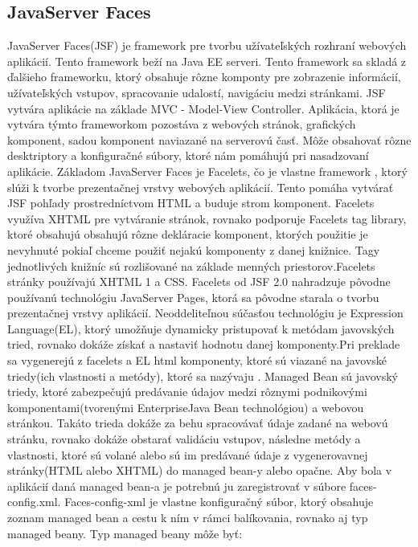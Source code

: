 \subsection{JavaServer Faces}
JavaServer Faces(JSF)  je framework pre tvorbu užívateľských rozhraní webových aplikácií. Tento framework beží na Java EE serveri. Tento framework sa skladá z ďalšieho frameworku, ktorý obsahuje rôzne komponty pre zobrazenie informácií, užívateľských vstupov, spracovanie udalostí, navigáciu medzi stránkami. JSF vytvára aplikácie na základe MVC - Model-View Controller. Aplikácia, ktorá je vytvára týmto frameworkom pozostáva z webových stránok, grafických komponent, sadou komponent naviazané na serverovú časť. Môže obsahovať rôzne desktriptory a konfiguračné súbory, ktoré nám pomáhujú pri nasadzovaní aplikácie. Základom JavaServer Faces je Facelets, čo je vlastne framework , ktorý slúži k tvorbe prezentačnej vrstvy webových aplikácií. Tento pomáha vytvárať JSF pohľady prostredníctvom HTML a buduje strom komponent. Facelets využíva XHTML pre vytváranie stránok, rovnako podporuje Facelets tag library, ktoré obsahujú obsahujú rôzne dekláracie komponent, ktorých použitie je nevyhnuté pokiaľ chceme použiť nejakú komponenty z danej knižnice. Tagy jednotlivých knižníc sú rozlišované na základe menných priestorov.Facelets stránky používajú XHTML 1 a CSS. Facelets od JSF 2.0 nahradzuje pôvodne používanú technológiu JavaServer Pages, ktorá sa pôvodne starala o tvorbu prezentačnej vrstvy aplikácií. Neoddeliteľnou súčasťou technológiu je Expression Language(EL), ktorý umožňuje dynamicky pristupovať k metódam javovských tried, rovnako dokáže získať a nastaviť hodnotu danej komponenty.Pri preklade sa vygenerejú z facelets a EL html komponenty, ktoré sú viazané na javovské triedy(ich vlastnosti a metódy), ktoré sa nazývaju . Managed Bean sú javovský triedy, ktoré zabezpečujú predávanie údajov medzi rôznymi podnikovými komponentami(tvorenými EnterpriseJava Bean technológiou) a webovou stránkou. Takáto trieda dokáže za behu spracovávať údaje zadané na webovú stránku, rovnako dokáže obstarať validáciu vstupov,  následne metódy a vlastnosti, ktoré sú volané alebo sú im predávané údaje z vygenerovavnej stránky(HTML alebo XHTML) do managed bean-y alebo opačne. Aby bola v aplikácií  daná managed bean-a je potrebnú ju zaregistrovať v súbore faces-config.xml. Faces-config-xml je vlastne konfiguračný súbor, ktorý obsahuje zoznam managed bean a cestu k ním v rámci balíkovania, rovnako aj typ managed beany. Typ managed beany môže byť: 
